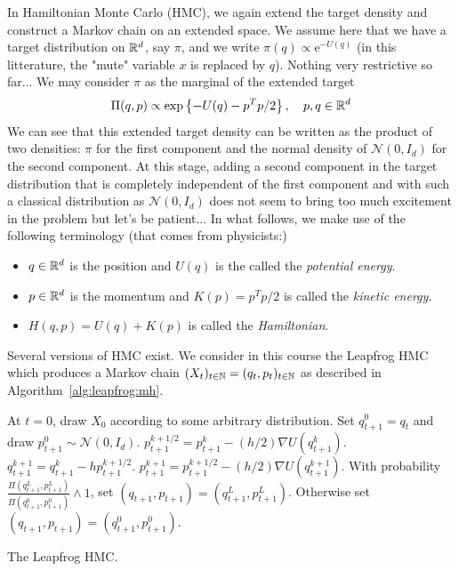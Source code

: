 \documentclass[english,graybox,envcountchap,envcountsame,sectrefs,shortlabels]{svmono}
\theoremstyle{style}
\newcommand{\rme}{\mathrm{e}}
\newcommand{\gauss}{\mathcal{N}}
\newcommand{\eqsp}{}
\begin{document}
In Hamiltonian Monte Carlo (HMC), we again extend the target density and construct a Markov chain on an extended space. We assume here that we have a target distribution on $\mathbb{R}^d$, say $\pi$, and we write $\pi(q)\propto \rme^{-U(q)}$ (in this litterature, the "mute" variable $x$ is replaced by $q$). Nothing very restrictive so far... We may consider $\pi$ as the marginal of the extended target
\begin{equation}
\label{eq:targ:hmc}
\Pi(q,p) \propto \exp \lrcb{-U(q)-p^Tp/2}\eqsp, \quad p,q \in \rset^d
\end{equation}
We can see that this extended target density can be written as the product of two densities: $\pi$ for the first component and the normal density of  $\gauss(0,I_d)$ for the second component. At this stage, adding a second component in the target distribution that is completely independent of the first component and with such a classical distribution as $\gauss(0,I_d)$ does not seem to bring too much excitement in the problem but let's be patient...
In what follows, we make use of the following terminology (that comes from physicists:)
\begin{itemize}
\item $q\in \mathbb{R}^d$ is the position and $U(q)$ is the called the {\em potential energy}.
\item $p\in \mathbb{R}^d$ is the momentum and $K(p)=p^Tp/2$ is called the {\em kinetic energy}.
\item $H(q,p)=U(q)+K(p)$ is called the {\em Hamiltonian}.
\end{itemize}
  
Several versions of HMC exist. We consider in this course the Leapfrog HMC which produces a Markov chain $(X_t)_{t\in\mathbb{N}}=(q_t,p_t)_{t\in\mathbb{N}}$    as described in Algorithm~\ref{alg:leapfrog:mh}.


\begin{algorithm}
\centering
\begin{algorithmic}
\State At $t=0$, draw $X_{0}$ according to some arbitrary distribution.
\State Set $q_{t+1}^0=q_{t}$ and draw $p_{t+1}^0\sim \gauss(0,I_d)$.
\State $p_{t+1}^{k+1/2}=p_{t+1}^k-(h/2) \nabla U(q_{t+1}^k)$.
\State  $q_{t+1}^{k+1}=q_{t+1}^k-h p_{t+1}^{k+1/2}$.
\State $p_{t+1}^{k+1}=p_{t+1}^{k+1/2}-(h/2) \nabla U (q_{t+1}^{k+1})$.
\EndFor
\State  With probability $\frac{\Pi(q_{t+1}^L,p_{t+1}^L)}{\Pi(q_{t+1}^0,p_{t+1}^0)}\wedge 1$, set $(q_{t+1},p_{t+1})=(q_{t+1}^L,p_{t+1}^L)$.
\State  Otherwise set $(q_{t+1},p_{t+1})=(q_{t+1}^0,p_{t+1}^0)$.
\EndFor
\end{algorithmic}
\label{alg:leapfrog:mh}
\caption{The Leapfrog HMC.}
\end{algorithm}
\end{document}
